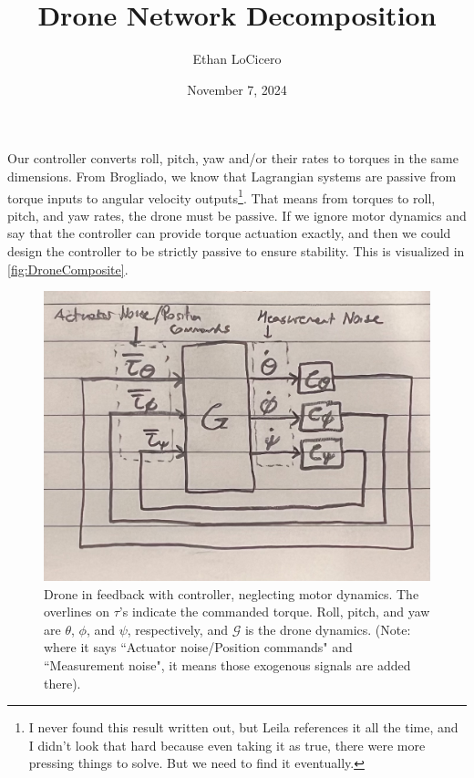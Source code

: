 \documentclass[10pt]{article}
\theoremstyle{definition}
\begin{document}
	
	
	\title{Drone Network Decomposition}
	\author{Ethan LoCicero}
	\date{November 7, 2024}
	\maketitle


Our controller converts roll, pitch, yaw and/or their rates to torques in the same dimensions. From Brogliado, we know that Lagrangian systems are passive from torque inputs to angular velocity outputs\footnote{I never found this result written out, but Leila references it all the time, and I didn't look that hard because even taking it as true, there were more pressing things to solve. But we need to find it eventually.}. That means from torques to roll, pitch, and yaw rates, the drone must be passive. If we ignore motor dynamics and say that the controller can provide torque actuation exactly, and then we could design the controller to be strictly passive to ensure stability. This is visualized in \autoref{fig:DroneComposite}.

\begin{figure}
	\centering
	\includegraphics[width=.5\textwidth]{DroneComposite}
	\caption{Drone in feedback with controller, neglecting motor dynamics. The overlines on $\tau$'s indicate the commanded torque. Roll, pitch, and yaw are $\theta$, $\phi$, and $\psi$, respectively, and $\mathcal{G}$ is the drone dynamics. (Note: where it says ``Actuator noise/Position commands" and ``Measurement noise", it means those exogenous signals are added there).}\label{fig:DroneComposite}
\end{figure}
\end{document}
